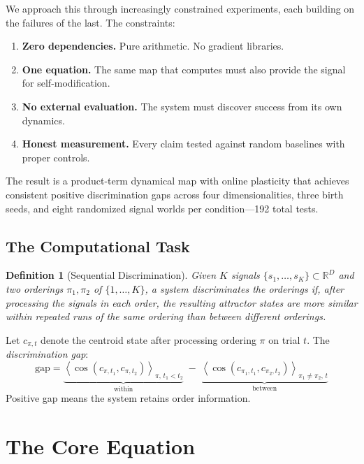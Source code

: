 \documentclass[11pt,a4paper]{article}
\newtheorem{definition}{Definition}
\begin{document}
We approach this through increasingly constrained experiments, each building on the failures of the last. The constraints:
\begin{enumerate}[nosep]
    \item \textbf{Zero dependencies.} Pure arithmetic. No gradient libraries.
    \item \textbf{One equation.} The same map that computes must also provide the signal for self-modification.
    \item \textbf{No external evaluation.} The system must discover success from its own dynamics.
    \item \textbf{Honest measurement.} Every claim tested against random baselines with proper controls.
\end{enumerate}

The result is a product-term dynamical map with online plasticity that achieves consistent positive discrimination gaps across four dimensionalities, three birth seeds, and eight randomized signal worlds per condition---192 total tests.

\subsection{The Computational Task}

\begin{definition}[Sequential Discrimination]
Given $K$ signals $\{s_1, \ldots, s_K\} \subset \mathbb{R}^D$ and two orderings $\pi_1, \pi_2$ of $\{1,\ldots,K\}$, a system \emph{discriminates} the orderings if, after processing the signals in each order, the resulting attractor states are more similar within repeated runs of the same ordering than between different orderings.
\end{definition}

Let $c_{\pi,t}$ denote the centroid state after processing ordering $\pi$ on trial $t$. The \emph{discrimination gap}:
\begin{equation}
\label{eq:gap}
\mathrm{gap} = \underbrace{\left\langle \cos(c_{\pi,t_1}, c_{\pi,t_2}) \right\rangle_{\pi,\, t_1<t_2}}_{\text{within}} \;-\; \underbrace{\left\langle \cos(c_{\pi_1,t_1}, c_{\pi_2,t_2}) \right\rangle_{\pi_1\neq\pi_2,\, t}}_{\text{between}}
\end{equation}
Positive gap means the system retains order information.

\section{The Core Equation}
\label{sec:equation}
\end{document}
